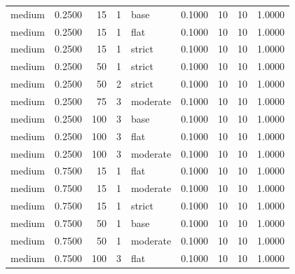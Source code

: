 \begin{tabular}{lrrrlrrrr}
medium & 0.2500 & 15 & 1 & base & 0.1000 & 10 & 10 & 1.0000 \\
medium & 0.2500 & 15 & 1 & flat & 0.1000 & 10 & 10 & 1.0000 \\
medium & 0.2500 & 15 & 1 & strict & 0.1000 & 10 & 10 & 1.0000 \\
medium & 0.2500 & 50 & 1 & strict & 0.1000 & 10 & 10 & 1.0000 \\
medium & 0.2500 & 50 & 2 & strict & 0.1000 & 10 & 10 & 1.0000 \\
medium & 0.2500 & 75 & 3 & moderate & 0.1000 & 10 & 10 & 1.0000 \\
medium & 0.2500 & 100 & 3 & base & 0.1000 & 10 & 10 & 1.0000 \\
medium & 0.2500 & 100 & 3 & flat & 0.1000 & 10 & 10 & 1.0000 \\
medium & 0.2500 & 100 & 3 & moderate & 0.1000 & 10 & 10 & 1.0000 \\
medium & 0.7500 & 15 & 1 & flat & 0.1000 & 10 & 10 & 1.0000 \\
medium & 0.7500 & 15 & 1 & moderate & 0.1000 & 10 & 10 & 1.0000 \\
medium & 0.7500 & 15 & 1 & strict & 0.1000 & 10 & 10 & 1.0000 \\
medium & 0.7500 & 50 & 1 & base & 0.1000 & 10 & 10 & 1.0000 \\
medium & 0.7500 & 50 & 1 & moderate & 0.1000 & 10 & 10 & 1.0000 \\
medium & 0.7500 & 100 & 3 & flat & 0.1000 & 10 & 10 & 1.0000 \\
\bottomrule
\end{tabular}
